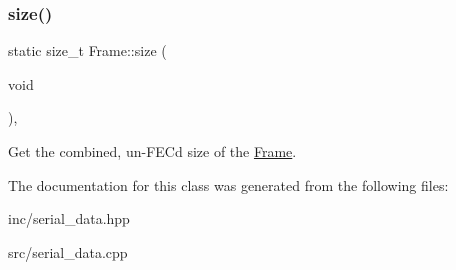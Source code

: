 \subsubsection{\texorpdfstring{size()}{size()}}
{\footnotesize\ttfamily static size\+\_\+t Frame\+::size (\begin{DoxyParamCaption}\item[{void}]{ }\end{DoxyParamCaption})\hspace{0.3cm}{\ttfamily [inline]}, {\ttfamily [static]}}

Get the combined, un-\/\+F\+EC\textquotesingle{}d size of the \hyperlink{classFrame}{Frame}. 

The documentation for this class was generated from the following files\+:\begin{DoxyCompactItemize}
\item 
inc/serial\+\_\+data.\+hpp\item 
src/serial\+\_\+data.\+cpp\end{DoxyCompactItemize}
